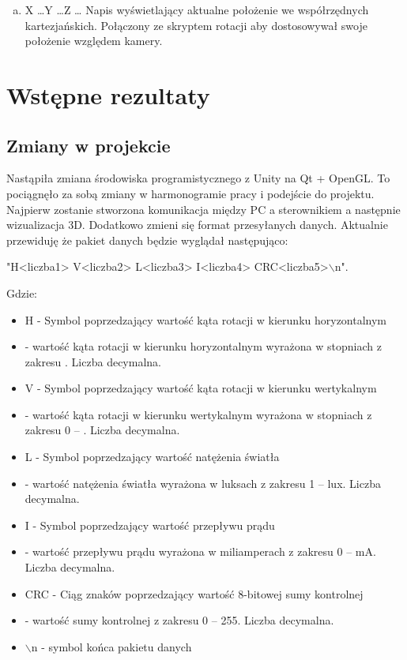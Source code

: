 \documentclass[10pt, a4paper]{article}
\begin{document}
\begin{enumerate}[I.]
\begin{enumerate}[a)]
				\item X \dots Y \dots Z \dots
				\newline	
				Napis wyświetlający aktualne położenie we współrzędnych kartezjańskich. Połączony ze skryptem rotacji aby dostosowywał swoje położenie względem kamery.
			\end{enumerate}
		\end{enumerate}
			
\newpage
\section{Wstępne rezultaty}
		\subsection{Zmiany w projekcie}
		Nastąpiła zmiana środowiska programistycznego z Unity na Qt + OpenGL. To pociągnęło za sobą zmiany w harmonogramie pracy i podejście do projektu. Najpierw zostanie stworzona komunikacja między PC a sterownikiem a następnie wizualizacja 3D. Dodatkowo zmieni się format przesyłanych danych. Aktualnie przewiduję że pakiet danych będzie wyglądał następująco: 
		\begin{center}
			"H<liczba1> V<liczba2> L<liczba3> I<liczba4> CRC<liczba5>$\backslash$n".
		\end{center}
		Gdzie:
		\begin{itemize}
			\item H - Symbol poprzedzający wartość kąta rotacji w kierunku horyzontalnym
			\item <liczba1> - wartość kąta rotacji w kierunku horyzontalnym wyrażona w stopniach z zakresu \newline \unit[0 -- 360]{\textdegree}. Liczba decymalna.
			\item V - Symbol poprzedzający wartość kąta rotacji w kierunku wertykalnym
			\item <liczba2> - wartość kąta rotacji w kierunku wertykalnym wyrażona w stopniach z zakresu 0 -- \unit[180]{\textdegree}. Liczba decymalna.
			\item L - Symbol poprzedzający wartość natężenia światła
			\item <liczba3> - wartość natężenia światła wyrażona w luksach z zakresu 1 -- \unit[65535]{lux}. Liczba decymalna.
			\item I - Symbol poprzedzający wartość przepływu prądu
			\item <liczba4> - wartość przepływu prądu wyrażona w miliamperach z zakresu 0 -- \unit[65535]{mA}. Liczba decymalna.
			\item CRC - Ciąg znaków poprzedzający wartość 8-bitowej sumy kontrolnej
			\item <liczba5> - wartość sumy kontrolnej z zakresu 0 -- 255. Liczba decymalna.
			\item $\backslash$n - symbol końca pakietu danych
		\end{itemize}
		
\end{document}
